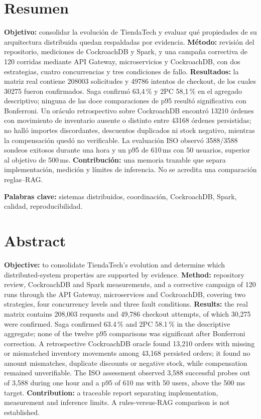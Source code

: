 \documentclass[12pt,a4paper]{article}
\begin{document}
\section*{Resumen}
\textbf{Objetivo:} consolidar la evolución de TiendaTech y evaluar qué propiedades de su arquitectura distribuida quedan respaldadas por evidencia. \textbf{Método:} revisión del repositorio, mediciones de CockroachDB y Spark, y una campaña correctiva de 120 corridas mediante API Gateway, microservicios y CockroachDB, con dos estrategias, cuatro concurrencias y tres condiciones de fallo. \textbf{Resultados:} la matriz real contiene 208003 solicitudes y 49786 intentos de checkout, de los cuales 30275 fueron confirmados. Saga confirmó 63,4\,\% y 2PC 58,1\,\% en el agregado descriptivo; ninguna de las doce comparaciones de p95 resultó significativa con Bonferroni. Un oráculo retrospectivo sobre CockroachDB encontró 13210 órdenes con movimiento de inventario ausente o distinto entre 43168 órdenes persistidas; no halló importes discordantes, descuentos duplicados ni stock negativo, mientras la compensación quedó no verificable. La evaluación ISO observó 3588/3588 sondeos exitosos durante una hora y un p95 de 610\,ms con 50 usuarios, superior al objetivo de 500\,ms. \textbf{Contribución:} una memoria trazable que separa implementación, medición y límites de inferencia. No se acredita una comparación reglas--RAG.

\textbf{Palabras clave:} sistemas distribuidos, coordinación, CockroachDB, Spark, calidad, reproducibilidad.
\clearpage
\section*{Abstract}
\textbf{Objective:} to consolidate TiendaTech's evolution and determine which distributed-system properties are supported by evidence. \textbf{Method:} repository review, CockroachDB and Spark measurements, and a corrective campaign of 120 runs through the API Gateway, microservices and CockroachDB, covering two strategies, four concurrency levels and three fault conditions. \textbf{Results:} the real matrix contains 208,003 requests and 49,786 checkout attempts, of which 30,275 were confirmed. Saga confirmed 63.4\,\% and 2PC 58.1\,\% in the descriptive aggregate; none of the twelve p95 comparisons was significant after Bonferroni correction. A retrospective CockroachDB oracle found 13,210 orders with missing or mismatched inventory movements among 43,168 persisted orders; it found no amount mismatches, duplicate discounts or negative stock, while compensation remained unverifiable. The ISO assessment observed 3,588 successful probes out of 3,588 during one hour and a p95 of 610 ms with 50 users, above the 500 ms target. \textbf{Contribution:} a traceable report separating implementation, measurement and inference limits. A rules-versus-RAG comparison is not established.
\end{document}
